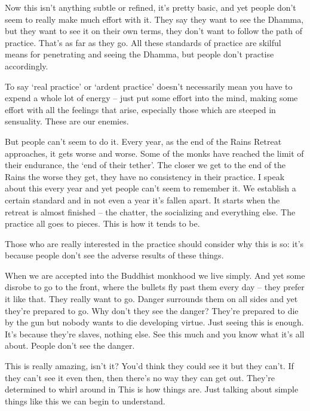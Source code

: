 Now this isn't anything subtle or refined, it's pretty basic, and yet people don't seem to really make much effort with it. They say they want to see the Dhamma, but they want to see it on their own terms, they don't want to follow the path of practice. That's as far as they go. All these standards of practice are skilful means for penetrating and seeing the Dhamma, but people don't practise accordingly.

To say `real practice' or `ardent practice' doesn't necessarily mean you have to expend a whole lot of energy -- just put some effort into the mind, making some effort with all the feelings that arise, especially those which are steeped in sensuality. These are our enemies.

But people can't seem to do it. Every year, as the end of the Rains Retreat approaches, it gets worse and worse. Some of the monks have reached the limit of their endurance, the `end of their tether'. The closer we get to the end of the Rains the worse they get, they have no consistency in their practice. I speak about this every year and yet people can't seem to remember it. We establish a certain standard and in not even a year it's fallen apart. It starts when the retreat is almost finished -- the chatter, the socializing and everything else. The practice all goes to pieces. This is how it tends to be.

Those who are really interested in the practice should consider why this is so: it's because people don't see the adverse results of these things.

When we are accepted into the Buddhist monkhood we live simply. And yet some disrobe to go to the front, where the bullets fly past them every day -- they prefer it like that. They really want to go. Danger surrounds them on all sides and yet they're prepared to go. Why don't they see the danger? They're prepared to die by the gun but nobody wants to die developing virtue. Just seeing this is enough. It's because they're slaves, nothing else. See this much and you know what it's all about. People don't see the danger.

This is really amazing, isn't it? You'd think they could see it but they can't. If they can't see it even then, then there's no way they can get out. They're determined to whirl around in  This is how things are. Just talking about simple things like this we can begin to understand.

